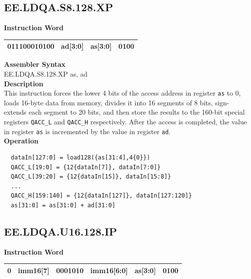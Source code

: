 \clearpage
\subsection{EE.LDQA.S8.128.XP}\label{instruction:EELDQAS8128XP}
\setlength\tabcolsep{6pt}
\textbf{Instruction Word} \\
\begin{tabular}{|c|c|c|c|}
	\hline
	011100010100 & ad[3:0] & as[3:0] & 0100 \\
	\hline
\end{tabular}

\textbf{Assembler Syntax} \\
EE.LDQA.S8.128.XP as, ad \\
\textbf{Description} \\
This instruction forces the lower 4 bits of the access address in register \lstinline{as} to 0, loads 16-byte data from memory, divides it into 16 segments of 8 bits, sign-extends each segment to 20 bits, and then store the results to the 160-bit special registers \lstinline{QACC_L} and \lstinline{QACC_H} respectively. After the access is completed, the value in register \lstinline{as} is incremented by the value in register \lstinline{ad}.\\
\textbf{Operation}
\begin{lstlisting}
  dataIn[127:0] = load128({as[31:4],4{0}})
  QACC_L[19:0] = {12{dataIn[7]}, dataIn[7:0]}
  QACC_L[39:20] = {12{dataIn[15]}, dataIn[15:8]}
  ...
  QACC_H[159:140] = {12{dataIn[127]}, dataIn[127:120]}
  as[31:0] = as[31:0] + ad[31:0]
\end{lstlisting}

\clearpage
\subsection{EE.LDQA.U16.128.IP}\label{instruction:EELDQAU16128IP}
\setlength\tabcolsep{6pt}
\textbf{Instruction Word} \\
\begin{tabular}{|c|c|c|c|c|c|}
	\hline
	0 & imm16[7] & 0001010 & imm16[6:0] & as[3:0] & 0100 \\
	\hline
\end{tabular}

